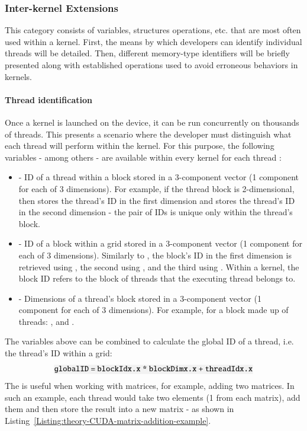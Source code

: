 \subsubsection{Inter-kernel Extensions}\label{Subsubsection:theory-CUDA-C++-extensions-inter-kernel-extensions}
This category consists of variables, structures operations, etc. that are most often used within a kernel. First, the means by which developers can identify individual threads will be detailed. Then, different memory-type identifiers will be briefly presented along with established operations used to avoid erroneous behaviors in kernels.

\paragraph{Thread identification}
Once a kernel is launched on the device, it can be run concurrently on thousands of threads. This presents a scenario where the developer must distinguish what each thread will perform within the kernel. For this purpose, the following variables - among others - are available within every kernel for each thread \cite{NVIDIAMay2022}:

\begin{itemize}
	\item {} - ID of a thread within a block stored in a 3-component vector (1 component for each of 3 dimensions). For example, if the thread block is 2-dimensional, then  stores the thread's ID in the first dimension and  stores the thread's ID in the second dimension - the pair of IDs is unique only within the thread's block.
	\item {} - ID of a block within a grid stored in a 3-component vector (1 component for each of 3 dimensions). Similarly to , the block's ID in the first dimension is retrieved using , the second using , and the third using . Within a kernel, the block ID refers to the block of threads that the executing thread belongs to.
	\item {} - Dimensions of a thread's block stored in a 3-component vector (1 component for each of 3 dimensions). For example, for a block made up of  threads: ,  and .
\end{itemize}

The variables above can be combined to calculate the global ID of a thread, i.e. the thread's ID within a grid:
$$\code{globalID = blockIdx.x * blockDimx.x + threadIdx.x}$$
The  is useful when working with matrices, for example, adding two matrices. In such an example, each thread would take two elements (1 from each matrix), add them and then store the result into a new matrix - as shown in Listing~\ref{Listing:theory-CUDA-matrix-addition-example}.

